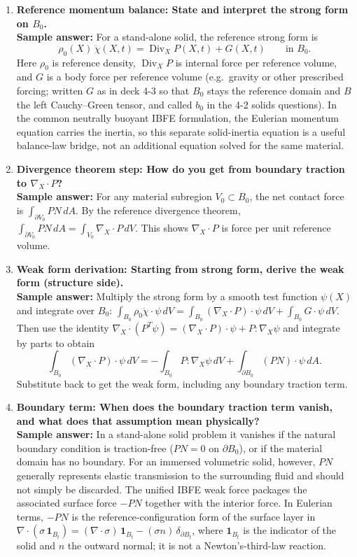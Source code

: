 \documentclass[12pt]{article}
\begin{document}
\begin{enumerate}
\item \textbf{Reference momentum balance: State and interpret the strong form on $B_0$.}\\
\textbf{Sample answer:} For a stand-alone solid, the reference strong form is
\[
\rho_0(X)\,\ddot{\chi}(X,t)=\operatorname{Div}_X P(X,t) + G(X,t)
\qquad\text{in }B_0.
\]
Here $\rho_0$ is reference density, $\operatorname{Div}_X P$ is internal force per reference volume, and $G$ is a body force per
reference volume (e.g.\ gravity or other prescribed forcing; written $G$ as in deck 4-3 so that $B_0$ stays the reference
domain and $B$ the left Cauchy--Green tensor, and called $b_0$ in the 4-2 solids questions). In the common neutrally buoyant IBFE formulation,
the Eulerian momentum equation carries the inertia, so this separate solid-inertia equation is a useful balance-law bridge,
not an additional equation solved for the same material.

\item \textbf{Divergence theorem step: How do you get from boundary traction to $\nabla_X\cdot P$?}\\
\textbf{Sample answer:} For any material subregion $V_0\subset B_0$,
the net contact force is $\int_{\partial V_0} P N\, dA$. By the reference divergence theorem,
$\int_{\partial V_0} PN\, dA = \int_{V_0} \nabla_X\cdot P \, dV$. This shows $\nabla_X\cdot P$ is force per unit reference volume.

\item \textbf{Weak form derivation: Starting from strong form, derive the weak form (structure side).}\\
\textbf{Sample answer:} Multiply the strong form by a smooth test function $\psi(X)$ and integrate over $B_0$:
$\int_{B_0}\rho_0 \ddot{\chi}\cdot \psi\, dV = \int_{B_0} (\nabla_X\cdot P)\cdot \psi\, dV + \int_{B_0} G\cdot \psi\, dV$.
Then use the identity $\nabla_X\cdot(P^T\psi)=(\nabla_X\cdot P)\cdot\psi + P:\nabla_X\psi$ and integrate by parts to obtain
\[
\int_{B_0} (\nabla_X\cdot P)\cdot \psi\, dV
= -\int_{B_0} P:\nabla_X\psi\, dV + \int_{\partial B_0} (PN)\cdot \psi\, dA.
\]
Substitute back to get the weak form, including any boundary traction term.

\item \textbf{Boundary term: When does the boundary traction term vanish, and what does that assumption mean physically?}\\
\textbf{Sample answer:} In a stand-alone solid problem it vanishes if the natural boundary condition is traction-free
($PN=0$ on $\partial B_0$), or if the material domain has no boundary. For an immersed volumetric solid, however,
$PN$ generally represents elastic transmission to the surrounding fluid and should not simply be discarded.
The unified IBFE weak force packages the associated surface force $-PN$ together with the interior force.
In Eulerian terms, $-PN$ is the reference-configuration form of the surface layer in
$\nabla\cdot(\sigma\,\mathbf{1}_{B_t})=(\nabla\cdot\sigma)\,\mathbf{1}_{B_t}-(\sigma n)\,\delta_{\partial B_t}$,
where $\mathbf{1}_{B_t}$ is the indicator of the solid and $n$ the outward normal; it is not a Newton's-third-law reaction.


\end{enumerate}
\end{document}
